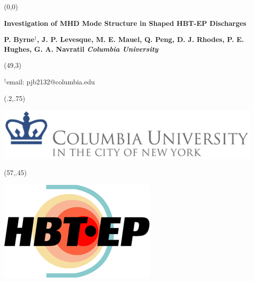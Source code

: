 \documentclass{article}
\begin{document}

%
%

\begin{textblock}{62}(0,0)


\begin{center}

\vspace{5mm}\def\myfig#1{\begin{center}\texttt{[image: \#1]}\end{center}}

{\VeryHuge\color{black} \textbf{Investigation of MHD Mode Structure in Shaped HBT-EP Discharges}}

\vspace{15mm}
\rm
\sf
\LARGE\textbf{\color{lnavy}
P. Byrne$^\dagger$, J. P. Levesque, M. E. Mauel, Q. Peng, D. J. Rhodes, P. E. Hughes, G. A. Navratil  \hspace{2in} \emph{Columbia University}}\\

\vspace{5mm}

\end{center}
\end{textblock}
\begin{textblock}{12}(49,3)
\begin{flushright}

{\color{black}$^{\dagger}$email: {pjb2132@columbia.edu} }\hspace{.25in}

\end{flushright}
\end{textblock}

\begin{textblock}{3}(.2,.75)

\includegraphics[scale =.75]{CU_logo_exported.png}

\end{textblock}


\begin{textblock}{1}(57,.45)

\includegraphics[scale =1]{hbt_logo.png}

\end{textblock}
\end{document}
